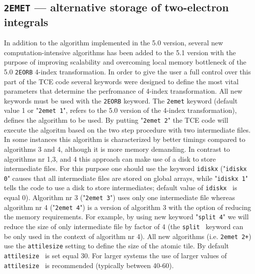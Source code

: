 \subsection{{\tt 2EMET} --- alternative storage of two-electron integrals}\label{subsection:2EMET}

In addition to the algorithm implemented in the 5.0 version, several new computation-intensive 
algorithms has been added to the 5.1 version with the purpose of improving scalability and overcoming 
local memory bottleneck of the 5.0 {\tt 2EORB} 4-index transformation. 
In order to give the user a full control over this part of the TCE code several keywords were designed to define the most vital
parameters that determine the perfromance of 4-index transformation. All new keywords must  be used
with the {\tt 2EORB} keyword. The {\tt 2emet} keyword (default value 1 or "{\tt 2emet 1}",
refers to the 5.0 version of the 4-index transformation), 
defines the algorithm to be used. By putting "{\tt 2emet 2}" the TCE code will execute 
the algoritm based on the two step procedure with two intermediate files. In some instances 
this algorithm is characterized by better timings compared to algorithms 3 and 4, although it is 
more memory demanding.  In contrast to algorithms nr 1,3, and 4 this approach can make use of  
a disk to store intermediate files.
For this purpose one should use the keyword {\tt idiskx} ("{\tt idiskx 0}" causes
that all intermediate files are stored on global arrays, while "{\tt idiskx 1}"
tells the code to use a disk to store intermediates; default value of {\tt idiskx } is equal 0).
Algorithm nr 3 ("{\tt 2emet 3}") uses only one intermediate file whereas
algorithm nr 4 ("{\tt 2emet 4}") is a version of algorithm 3 with the option of reducing the 
memory requirements. For example, by using new keyword "{\tt split 4}"  we will reduce the size of 
only  intermediate file by factor of 4 (the {\tt split } keyword can be only used in the context of
algorithm nr 4). 
All new algorithms (i.e. {\tt 2emet 2+}) use the {\tt attilesize} setting to define the size of the atomic tile.
By default {\tt attilesize } is set equal 30. For larger systems the use of larger values of 
{\tt attilesize } is recommended (typically between 40-60).

